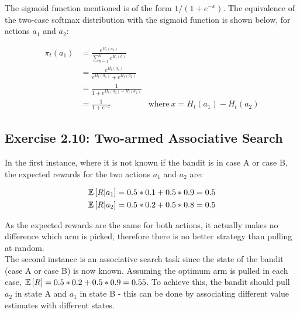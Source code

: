 The sigmoid function mentioned is of the form $1/(1+e^{-x})$. The equivalence of the two-case softmax distribution with the sigmoid function is shown below, for actions $a_1$ and $a_2$:

\vspace{-6mm}
\begingroup
\addtolength{\jot}{0.5em}
\begin{align*}
\pi_t(a_1) &= \frac{e^{H_t(a_1)}}{\sum_{b=1}^{k}e^{H_t(b)}} \\
&= \frac{e^{H_t(a_1)}}{e^{H_t(a_1)} + e^{H_t(a_2)}} \\
&= \frac{1}{1 + e^{H_t(a_2) - H_t(a_1)}} \\
&= \frac{1}{1 + e^{-x}} & \text{where} \ x = H_t(a_1) - H_t(a_2)
\end{align*}
\endgroup

\subsection*{Exercise 2.10: Two-armed Associative Search}

In the first instance, where it is not known if the bandit is in case A or case B, the expected rewards for the two actions $a_1$ and $a_2$ are:

\vspace{-6mm}
\begin{align*}
{\mathbb E}\left[ R|a_1 \right] &= 0.5 * 0.1 + 0.5 * 0.9 = 0.5 \\
{\mathbb E}\left[ R|a_2 \right] &= 0.5 * 0.2 + 0.5 * 0.8 = 0.5 
\end{align*}

As the expected rewards are the same for both actions, it actually makes no difference which arm is picked, therefore there is no better strategy than pulling at random. \\

The second instance is an associative search task since the state of the bandit (case A or case B) is now known. Assuming the optimum arm is pulled in each case, ${\mathbb E}\left[ R \right] = 0.5 * 0.2 + 0.5 * 0.9 = 0.55$. To achieve this, the bandit should pull $a_2$ in state A and $a_1$ in state B - this can be done by associating different value estimates with different states.



